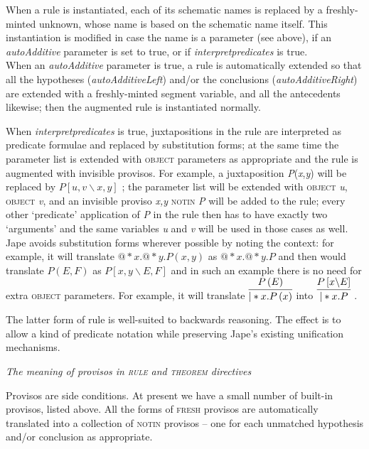 \documentclass[11pt]{book}
\begin{document}
When a rule is instantiated, each of its schematic names is replaced by a freshly-minted unknown, whose name is based on the schematic name itself. This instantiation is modified in case the name is a parameter (see above), if an \textit{autoAdditive} parameter is set to true, or if \textit{interpretpredicates} is true.\\
When an \textit{autoAdditive} parameter is true, a rule is automatically extended so that all the hypotheses (\textit{autoAdditiveLeft}) and/or the conclusions (\textit{autoAdditiveRight}) are extended with a freshly-minted segment variable, and all the antecedents likewise; then the augmented rule is instantiated normally.


When \textit{interpretpredicates} is true, juxtapositions in the rule are interpreted as predicate formulae and replaced by substitution forms; at the same time the parameter list is extended with \textsc{object} parameters as appropriate and the rule is augmented with invisible provisos. For example, a juxtaposition \textit{P}(\textit{x},\textit{y}) will be replaced by $P\left[ u,v\backslash x,y\right] $ ; the parameter list will be extended with \textsc{object} \textit{u}, \textsc{object} \textit{v}, and an invisible proviso \textit{x,y} \textsc{notin} \textit{P} will be added to the rule; every other `predicate' application of \textit{P} in the rule then has to have exactly two `arguments' and the same variables \textit{u} and \textit{v} will be used in those cases as well. Jape avoids substitution forms wherever possible by noting the context: for example, it will translate $@*x.@*y.P\left( x,y\right) $ as $@*x.@*y.P$ and then would translate $P\left( E,F\right) $ as $P\left[ x,y\backslash E,F\right] $ and in such an example there is no need for extra \textsc{object} parameters. For example, it will translate $\infer{|*x.P\left( x\right) }
       {P\left( E\right) }$ into $\infer{|*x.P}
       {P\left[ x\backslash E\right] }$ .


The latter form of rule is well-suited to backwards reasoning. The effect is to allow a kind of predicate notation while preserving Jape's existing unification mechanisms.


\textit{The meaning of provisos in \textsc{rule} and \textsc{theorem} directives}


Provisos are side conditions. At present we have a small number of built-in provisos, listed above. All the forms of \textsc{fresh} provisos are automatically translated into a collection of \textsc{notin} provisos -- one for each unmatched hypothesis and/or conclusion as appropriate.
\end{document}
